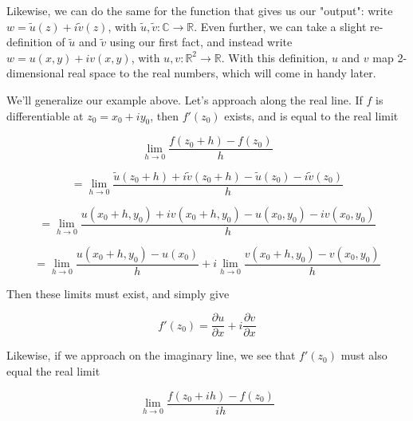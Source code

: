 \documentclass{article}
\begin{document}

Likewise, we can do the same for the function that gives us our "output": write $w = \tilde{u}(z) + i\tilde{v}(z)$, with $\tilde{u}, \tilde{v}: \mathbb{C} \rightarrow \mathbb{R}$. Even further, we can take a slight re-definition of $\tilde{u}$ and $\tilde{v}$ using our first fact, and instead write $w = u(x,y) + iv(x,y)$, with $u, v: \mathbb{R}^2 \rightarrow \mathbb{R}$. With this definition, $u$ and $v$ map 2-dimensional real space to the real numbers, which will come in handy later.

We'll generalize our example above. Let's approach along the real line. If $f$ is differentiable at $z_0 = x_0 + iy_0$, then $f'(z_0)$ exists, and is equal to the real limit

\begin{equation}
\lim_{h \to 0}\frac{f(z_0 + h)-f(z_0)}{h}
\end{equation}

\begin{equation}
= \lim_{h \to 0}\frac{\tilde{u}(z_0 + h) + i\tilde{v}(z_0 + h) - \tilde{u}(z_0) - i\tilde{v}(z_0)}{h}
\end{equation}

\begin{equation}
= \lim_{h \to 0}\frac{u(x_0 + h, y_0) + iv(x_0 + h, y_0) - u(x_0, y_0) - iv(x_0, y_0)}{h}
\end{equation}

\begin{equation}
= \lim_{h \to 0}\frac{u(x_0+h, y_0) - u(x_0)}{h} + i\lim_{h \to 0}\frac{v(x_0+h, y_0)-v(x_0, y_0)}{h}
\end{equation}


Then these limits must exist, and simply give

\begin{equation}
\label{eq:deriv_f_real_line}
f'(z_0) = \frac{\partial u}{\partial x} + i\frac{\partial v}{\partial x}
\end{equation}


Likewise, if we approach on the imaginary line, we see that $f'(z_0)$ must also equal the real limit

\begin{equation}
\lim_{h \to 0}\frac{f(z_0 + ih)-f(z_0)}{ih}
\end{equation}
\end{document}
